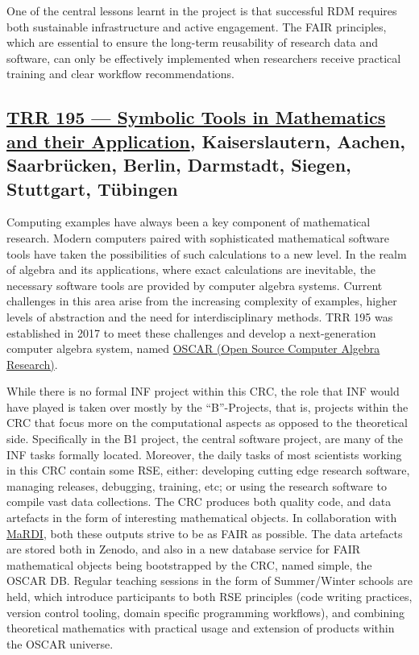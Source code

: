 \documentclass{eceasst}
\begin{document}
One of the central lessons learnt in the project is that successful RDM requires both sustainable infrastructure and active engagement.
The FAIR principles, which are essential to ensure the long-term reusability of research data and software, can only be effectively implemented when researchers receive practical training and clear workflow recommendations.

\subsection{\href{https://www.computeralgebra.de/sfb/}{TRR 195 --- Symbolic Tools in Mathematics and their Application}, Kaiserslautern, Aachen, Saarbrücken, Berlin, Darmstadt, Siegen, Stuttgart, Tübingen}
Computing examples have always been a key component of mathematical research. Modern computers paired
with sophisticated mathematical software tools have taken the possibilities of such calculations to
a new level. In the realm of algebra and its applications, where exact calculations are inevitable,
the necessary software tools are provided by computer algebra systems. Current challenges in this
area arise from the increasing complexity of examples, higher levels of abstraction and the need for
interdisciplinary methods. TRR 195 was established in 2017 to meet these challenges and develop
a next-generation computer algebra system, named \href{https://www.oscar-system.org/}{OSCAR (Open
Source Computer Algebra Research)}.

While there is no formal INF project within this CRC, the role that INF would have played is taken
over mostly by the ``B''-Projects, that is, projects within the CRC that focus more on the
computational aspects as opposed to the theoretical side. Specifically in the B1 project, the
central software project, are many of the INF tasks formally located. Moreover, the daily tasks of
most scientists working in this CRC contain some RSE, either: developing
cutting edge research software, managing releases, debugging, training, etc; or using the research
software to compile vast data collections. The CRC produces both quality code, and data artefacts in
the form of interesting mathematical objects. In collaboration with \href{https://www.mardi4nfdi.de/}{MaRDI}, both these outputs strive
to be as FAIR as possible. The data artefacts are stored both in Zenodo, and also in a new database
service for FAIR mathematical objects being bootstrapped by the CRC, named simple, the OSCAR DB.\@
Regular teaching sessions in the form of Summer/Winter schools are held, which introduce
participants to both RSE principles (code writing practices, version control tooling, domain
specific programming workflows), and combining theoretical mathematics with practical usage and
extension of products within the OSCAR universe.
\end{document}
